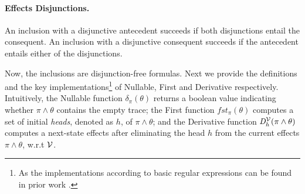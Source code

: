 \documentclass[acmsmall,10pt,review]{acmart}
\newcommand{\env}{\code{\mathcal{V}}}
\newcommand{\es}{\theta}
\newcommand{\code}[1]{{\tt{\ensuremath{\m{#1}}}}}
\newcommand{\empt}{\textcolor{black}{\ensuremath{\epsilon}}}
\newcommand{\m}{\mathit}
\begin{document}
{\paragraph{\textbf{Effects Disjunctions.}}
An inclusion with a disjunctive antecedent succeeds if both disjunctions entail the consequent.  An inclusion with a disjunctive consequent succeeds if the antecedent entails either of the disjunctions.  
{ 

}

Now, the inclusions are disjunction-free formulas. 
Next we provide the definitions and the key implementations\footnote{As 
the implementations according to basic regular expressions can be found 
in prior work \cite{keil2014symbolic}. 
} of Nullable, First and Derivative respectively. Intuitively, 
the Nullable function \code{\delta_{{\pi}}(\es)} returns a boolean 
value indicating whether \code{{\pi} \wedge \es} contains the empty 
trace; the First function \code{fst_{{\pi}}( \es)} computes a set of 
 initial \emph{heads}, denoted as \code{h},  of \code{{\pi} \wedge \es}; and the Derivative 
function \code{D^{\env}_{h}(\pi \wedge \es)} computes a next-state 
effects after eliminating the head  \code{h} from the current 
effects \code{{\pi} \wedge \es}, w.r.t \code{\env}. 

%


}
\end{document}
